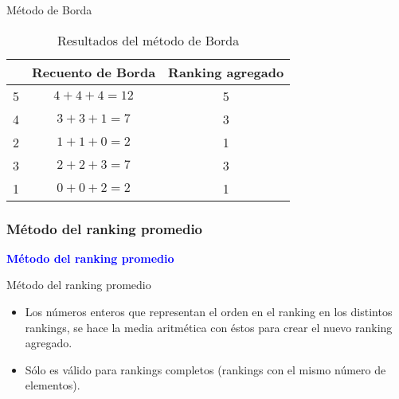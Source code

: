 \documentclass[10pt]{beamer}
\begin{document}
	\begin{frame}{Método de Borda}
		\begin{ejemplo}[continuación]
			
			\begin{table}[h]
				\centering
				\caption{Resultados del método de Borda}
				\label{tbl:borda_resultados}

				\begin{tabular}{@{}ccc@{}}
					\cmidrule(l){2-3}
					& Recuento de Borda & Ranking agregado \\ \midrule
					5 & $4 + 4 + 4 = 12$       & 5       \\
					4 & $3 + 3 + 1 =  7$       & 3       \\
					2 & $1 + 1 + 0 =  2$       & 1       \\
					3 & $2 + 2 + 3 =  7$       & 3       \\
					1 & $0 + 0 + 2 =  2$       & 1       \\ \bottomrule
				\end{tabular}

			\end{table}
			
		\end{ejemplo}
	\end{frame}
	
	\subsubsection{Método del ranking promedio}
	
	\begin{frame}
		\begin{center}
			\Huge\textbf{\textsf{\textcolor{blue}{Método del ranking promedio}}}
		\end{center}
	\end{frame}
	
	\begin{frame}{Método del ranking promedio}
		\begin{itemize}
			\item Los números enteros que representan el orden en el ranking en los distintos rankings, se hace la media aritmética con éstos para crear el nuevo ranking agregado.
			
			\item Sólo es válido para rankings completos (rankings con el mismo número de elementos).
		\end{itemize}
	\end{frame}
	
\end{document}
